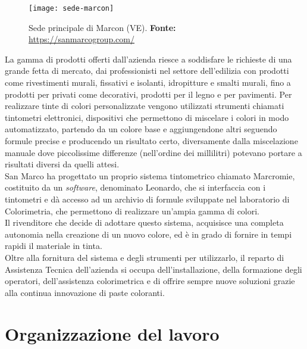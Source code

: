 \vspace{10pt}
\begin{figure}[htbp]
	\begin{center}
		\texttt{[image: sede-marcon]}
		\caption{Sede principale di Marcon (VE). \newline \textbf{Fonte: }\url{https://sanmarcogroup.com/}}
	\end{center}
\end{figure}
\vspace{10pt}

La gamma di prodotti offerti dall'azienda riesce a soddisfare le richieste di una grande fetta di mercato, dai professionisti nel settore dell'edilizia con prodotti come rivestimenti murali, fissativi e isolanti, idropitture e smalti murali, fino a prodotti per privati come decorativi, prodotti per il legno e per pavimenti.
Per realizzare tinte di colori personalizzate vengono utilizzati strumenti chiamati tintometri elettronici, dispositivi che permettono di miscelare i colori in modo automatizzato, partendo da un colore base e aggiungendone altri seguendo formule precise e producendo un risultato certo, diversamente dalla miscelazione manuale dove piccolissime differenze (nell'ordine dei millilitri) potevano portare a risultati diversi da quelli attesi. \\
San Marco ha progettato un proprio sistema tintometrico chiamato Marcromie, costituito da un \textit{software}, denominato Leonardo, che si interfaccia con i tintometri e dà accesso ad un archivio di formule sviluppate nel laboratorio di Colorimetria, che permettono di realizzare un'ampia gamma di colori. \\
Il rivenditore che decide di adottare questo sistema, acquisisce una completa autonomia nella creazione di un nuovo colore, ed è in grado di fornire in tempi rapidi il materiale in tinta.\\
Oltre alla fornitura del sistema e degli strumenti per utilizzarlo, il reparto di Assistenza Tecnica dell'azienda si occupa dell'installazione, della formazione degli operatori, dell'assistenza colorimetrica e di offrire sempre nuove soluzioni grazie alla continua innovazione di paste coloranti. 


\section{Organizzazione del lavoro}

